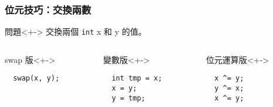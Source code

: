 \documentclass[utf8]{beamer}
\begin{document}
\begin{CJK}{UTF8}{bkai}
\begin{frame}[fragile]
  \frametitle{位元技巧：交換兩數}
  \begin{block}{問題}<+->
  交換兩個 \lstinline{int}{} x 和 y 的值。
  \end{block}
  \begin{columns}[T]
    \begin{column}[T]{3.5cm}
    \begin{exampleblock}{swap 版}<+->
      \begin{lstlisting}
  swap(x, y);
      \end{lstlisting}
    \end{exampleblock}
    \end{column}
    \begin{column}[T]{3.5cm}
    \begin{exampleblock}{變數版}<+->
      \begin{lstlisting}
  int tmp = x;
  x = y;
  y = tmp;
      \end{lstlisting}
    \end{exampleblock}
    \end{column}
    \begin{column}[T]{3.5cm}
    \begin{alertblock}{位元運算版}<+->
      \begin{lstlisting}
  x ^= y;
  y ^= x;
  x ^= y;
      \end{lstlisting}
    \end{alertblock}
    \end{column}
  \end{columns}
\end{frame}


\end{CJK}
\end{document}
